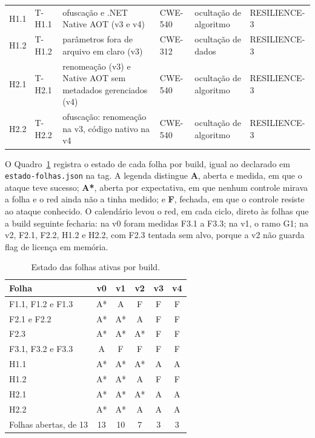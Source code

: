 {\begin{longtable}{L{1.0cm}L{1.5cm}L{5.0cm}L{1.6cm}L{2.5cm}L{2.2cm}}
H1.1 & T-H1.1 & ofuscação e .NET Native AOT (v3 e v4) & CWE-540 & ocultação de algoritmo & RESILIENCE-3 \\
H1.2 & T-H1.2 & parâmetros fora de arquivo em claro (v3) & CWE-312 & ocultação de dados & RESILIENCE-3 \\
H2.1 & T-H2.1 & renomeação (v3) e Native AOT sem metadados gerenciados (v4) & CWE-540 & ocultação de algoritmo & RESILIENCE-3 \\
H2.2 & T-H2.2 & ofuscação: renomeação na v3, código nativo na v4 & CWE-540 & ocultação de algoritmo & RESILIENCE-3 \\
\end{longtable}
}

O Quadro~\ref{qd:estados} registra o estado de cada folha por build, igual ao declarado em \texttt{estado-folhas.json} na tag. A legenda distingue \textbf{A}, aberta e medida, em que o ataque teve sucesso; \textbf{A*}, aberta por expectativa, em que nenhum controle mirava a folha e o red ainda não a tinha medido; e \textbf{F}, fechada, em que o controle resiste ao ataque conhecido. O calendário levou o red, em cada ciclo, direto às folhas que a build seguinte fecharia: na v0 foram medidas F3.1 a F3.3; na v1, o ramo G1; na v2, F2.1, F2.2, H1.2 e H2.2, com F2.3 tentada sem alvo, porque a v2 não guarda flag de licença em memória.

\begin{table}[htbp]
\centering
\caption{Estado das folhas ativas por build.}
\label{qd:estados}
\small
\begin{tabular}{lccccc}
\toprule
Folha & v0 & v1 & v2 & v3 & v4 \\
\midrule
F1.1, F1.2 e F1.3 & A* & A & F & F & F \\
F2.1 e F2.2 & A* & A* & A & F & F \\
F2.3 & A* & A* & A* & F & F \\
F3.1, F3.2 e F3.3 & A & F & F & F & F \\
H1.1 & A* & A* & A* & A & A \\
H1.2 & A* & A* & A & F & F \\
H2.1 & A* & A* & A* & A & A \\
H2.2 & A* & A* & A & A & A \\
\midrule
Folhas abertas, de 13 & 13 & 10 & 7 & 3 & 3 \\
\bottomrule
\end{tabular}
\end{table}

